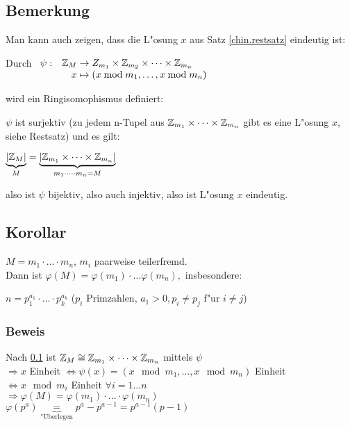 
\subsection{Bemerkung} \label{chinsatzeindeutig}
Man kann auch zeigen, dass die L"osung $x$ aus Satz \ref{chin.restsatz} eindeutig ist:

Durch 
$\begin{array}[t]{lr@{\;}c@{\;}l}
\psi:&	\Z_M &\to&  Z_{m_1} \times \Z_{m_2} \times \dots \times \Z_{m_n} \\
&	x	&\mapsto& (x \mod{m_1}, \dots, x \mod{m_n})
\end{array}$

wird ein Ringisomophismus definiert:

$\psi$ ist surjektiv (zu jedem n-Tupel aus $\mathbb{Z}_{m_1}\times \dots \times \mathbb{Z}_{m_n}$ gibt es eine L"osung $x$, siehe Restsatz) und es gilt:

$\underbrace{|\mathbb{Z}_M|}_{M}=\underbrace{|\mathbb{Z}_{m_1}\times \dots \times \mathbb{Z}_{m_n}|}_{m_1\cdot \dots \cdot m_n = M}$

also ist $\psi$ bijektiv, also auch injektiv, also ist L"osung $x$ eindeutig.

\subsection[Korollar: Phi-Funktion berechnen]{Korollar}
$M=m_1\cdot \dots \cdot m_n$, $m_i$ paarweise teilerfremd.\\
Dann ist $\varphi(M)=\varphi(m_1)\cdot \dots \varphi(m_n),$ insbesondere:

$n=p^{a_1}_1 \cdot \dots \cdot p^{a_k}_k$ ($p_i$ Primzahlen, $a_1>0, p_i \neq p_j$ f"ur $i\neq j$)

\subsubsection*{Beweis}

Nach \ref{chinsatzeindeutig} ist $\mathbb{Z}_M \cong \mathbb{Z}_{m_1} \times \dots \times \mathbb{Z}_{m_n}$ mittels $\psi$\\
$\Rightarrow x$ Einheit $\Leftrightarrow \psi(x) = ( x\mod{m_1}, \dots, x \mod{m_n})$ Einheit
\\ $\Leftrightarrow x \mod{m_i}$ Einheit $\forall i = 1 \dots n$\\
$\Rightarrow \varphi(M) = \varphi(m_1) \cdot \dots \cdot \varphi(m_n)$\\
$\varphi(p^a)\underbrace{=}_{\text{"Uberlegen}}p^a - p^{a-1} = p^{a-1}(p-1)$

